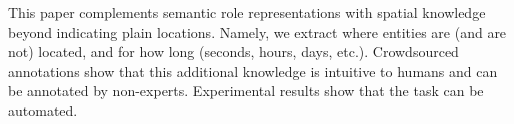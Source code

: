 This paper complements semantic role representations with spatial knowledge beyond indicating plain locations. Namely, we extract where entities are (and are not) located, and for how long (seconds, hours, days, etc.). Crowdsourced annotations show that this additional knowledge is intuitive to humans and can be annotated by non-experts. Experimental results show that the task can be automated.
